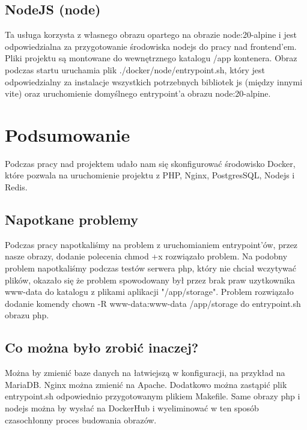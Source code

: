 \documentclass{article}
\begin{document}
\subsection{NodeJS (node)}
Ta usługa korzysta z własnego obrazu opartego na obrazie node:20-alpine i jest odpowiedzialna za przygotowanie środowiska nodejs do pracy nad frontend'em. Pliki projektu są montowane do wewnętrznego katalogu /app kontenera. Obraz podczas startu uruchamia plik ./docker/node/entrypoint.sh, który jest odpowiedzialny za instalacje wszystkich potrzebnych bibliotek js (między innymi vite) oraz uruchomienie domyślnego entrypoint'a obrazu node:20-alpine.

\section{Podsumowanie}
Podczas pracy nad projektem udało nam się skonfigurować środowisko Docker, które pozwala na uruchomienie projektu z PHP, Nginx, PostgresSQL, Nodejs i Redis. 

\subsection{Napotkane problemy}
Podczas pracy napotkaliśmy na problem z uruchomianiem entrypoint'ów, przez nasze obrazy, dodanie polecenia chmod +x rozwiązało problem. Na podobny problem napotkaliśmy podczas testów serwera php, który nie chciał wczytywać plików, okazało się że problem spowodowany był przez brak praw uzytkownika www-data do katalogu z plikami aplikacji "/app/storage". Problem rozwiązało dodanie komendy chown -R www-data:www-data /app/storage
do entrypoint.sh obrazu php.

\subsection{Co można było zrobić inaczej?}
Można by zmienić baze danych na łatwiejszą w konfiguracji, na przykład na MariaDB. Nginx można zmienić na Apache. Dodatkowo można zastąpić plik entrypoint.sh odpowiednio przygotowanym plikiem Makefile. Same obrazy php i nodejs można by wysłać na DockerHub i wyeliminować w ten sposób czasochłonny proces budowania obrazów.
\end{document}
